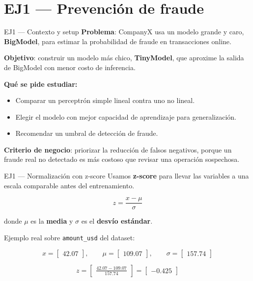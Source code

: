 \documentclass[aspectratio=169,10pt]{beamer}
\begin{document}
\section{EJ1 --- Prevención de fraude}

\begin{frame}{EJ1 --- Contexto y setup}
  \small
  \textbf{Problema}: CompanyX usa un modelo grande y caro, \textbf{BigModel},
  para estimar la probabilidad de fraude en transacciones online.

  \vspace{0.4em}
  \textbf{Objetivo}: construir un modelo más chico, \textbf{TinyModel}, que
  aproxime la salida de BigModel con menor costo de inferencia.

  \vspace{0.4em}
  \textbf{Qué se pide estudiar:}
  \begin{itemize}
    \item Comparar un perceptrón simple lineal contra uno no lineal.
    \item Elegir el modelo con mejor capacidad de aprendizaje para generalización.
    \item Recomendar un umbral de detección de fraude.
  \end{itemize}

  \vspace{0.3em}
  \textbf{Criterio de negocio}: priorizar la reducción de falsos negativos,
  porque un fraude real no detectado es más costoso que revisar una operación
  sospechosa.
\end{frame}

\begin{frame}{EJ1 --- Normalización con z-score}
  \small
  Usamos \textbf{z-score} para llevar las variables a una escala comparable
  antes del entrenamiento.

  \vspace{0.4em}
  \[
    z = \frac{x - \mu}{\sigma}
  \]

  \scriptsize
  donde $\mu$ es la \textbf{media} y $\sigma$ es el \textbf{desvío estándar}.

  \vspace{0.4em}
  \scriptsize
  Ejemplo real sobre \texttt{amount\_usd} del dataset:

  \[
    x =
    \begin{bmatrix}
      42.07
    \end{bmatrix},
    \qquad
    \mu =
    \begin{bmatrix}
      109.07
    \end{bmatrix},
    \qquad
    \sigma =
    \begin{bmatrix}
      157.74
    \end{bmatrix}
  \]

  \[
    z =
    \begin{bmatrix}
      \frac{42.07 - 109.07}{157.74}
    \end{bmatrix}
    =
    \begin{bmatrix}
      -0.425
    \end{bmatrix}
  \]
\end{frame}
\end{document}
